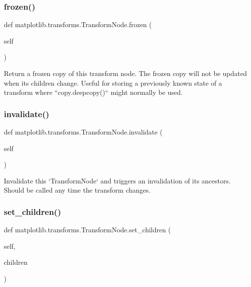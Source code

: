 \subsubsection{\texorpdfstring{frozen()}{frozen()}}
{\footnotesize\ttfamily def matplotlib.\+transforms.\+Transform\+Node.\+frozen (\begin{DoxyParamCaption}\item[{}]{self }\end{DoxyParamCaption})}

\begin{DoxyVerb}Return a frozen copy of this transform node.  The frozen copy will not
be updated when its children change.  Useful for storing a previously
known state of a transform where ``copy.deepcopy()`` might normally be
used.
\end{DoxyVerb}
 \mbox{\label{classmatplotlib_1_1transforms_1_1TransformNode_ae1544e935b8b0a669c853b203c23f7a3}} 
\subsubsection{\texorpdfstring{invalidate()}{invalidate()}}
{\footnotesize\ttfamily def matplotlib.\+transforms.\+Transform\+Node.\+invalidate (\begin{DoxyParamCaption}\item[{}]{self }\end{DoxyParamCaption})}

\begin{DoxyVerb}Invalidate this `TransformNode` and triggers an invalidation of its
ancestors.  Should be called any time the transform changes.
\end{DoxyVerb}
 \mbox{\label{classmatplotlib_1_1transforms_1_1TransformNode_a63457ed969d643c0716d892944ac808b}} 
\subsubsection{\texorpdfstring{set\+\_\+children()}{set\_children()}}
{\footnotesize\ttfamily def matplotlib.\+transforms.\+Transform\+Node.\+set\+\_\+children (\begin{DoxyParamCaption}\item[{}]{self,  }\item[{}]{children }\end{DoxyParamCaption})}

